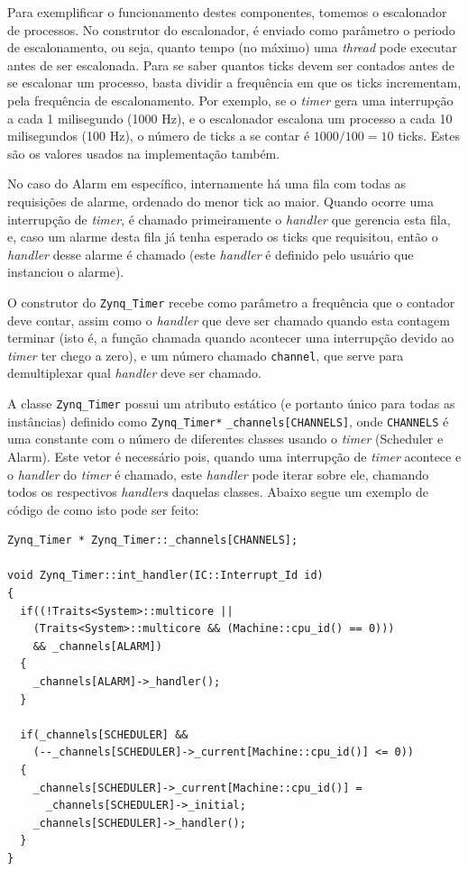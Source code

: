 Para exemplificar o funcionamento destes componentes, tomemos o escalonador de processos. No construtor do escalonador, é enviado como parâmetro o periodo de escalonamento, ou seja, quanto tempo (no máximo) uma \emph{thread} pode executar antes de ser escalonada. Para se saber quantos ticks devem ser contados antes de se escalonar um processo, basta dividir a frequência em que os ticks incrementam, pela frequência de escalonamento. Por exemplo, se o \emph{timer} gera uma interrupção a cada 1 milisegundo (1000 Hz), e o escalonador escalona um processo a cada 10 milisegundos (100 Hz), o número de ticks a se contar é $1000/100 = 10$ ticks. Estes são os valores usados na implementação também.

No caso do Alarm em específico, internamente há uma fila com todas as requisições de alarme, ordenado do menor tick ao maior. Quando ocorre uma interrupção de \emph{timer}, é chamado primeiramente o \emph{handler} que gerencia esta fila, e, caso um alarme desta fila já tenha esperado os ticks que requisitou, então o \emph{handler} desse alarme é chamado (este \emph{handler} é definido pelo usuário que instanciou o alarme).


O construtor do \verb+Zynq_Timer+ recebe como parâmetro a frequência que o contador deve contar, assim como o \emph{handler} que deve ser chamado quando esta contagem terminar (isto é, a função chamada quando acontecer uma interrupção devido ao \emph{timer} ter chego a zero), e um número chamado \verb+channel+, que serve para demultiplexar qual \emph{handler} deve ser chamado.

A classe \verb+Zynq_Timer+ possui um atributo estático (e portanto único para todas as instâncias) definido como \verb+Zynq_Timer*+ \verb+_channels[CHANNELS]+, onde \verb+CHANNELS+ é uma constante com o número de diferentes classes usando o \emph{timer} (Scheduler e Alarm). Este vetor é necessário pois, quando uma interrupção de \emph{timer} acontece e o \emph{handler} do \emph{timer} é chamado, este \emph{handler} pode iterar sobre ele, chamando todos os respectivos \emph{handlers} daquelas classes. Abaixo segue um exemplo de código de como isto pode ser feito:


\label{int_handler}
\begin{lstlisting}
Zynq_Timer * Zynq_Timer::_channels[CHANNELS];

void Zynq_Timer::int_handler(IC::Interrupt_Id id)
{
  if((!Traits<System>::multicore ||
    (Traits<System>::multicore && (Machine::cpu_id() == 0)))
    && _channels[ALARM])
  {
    _channels[ALARM]->_handler();
  }

  if(_channels[SCHEDULER] &&
    (--_channels[SCHEDULER]->_current[Machine::cpu_id()] <= 0))
  {
    _channels[SCHEDULER]->_current[Machine::cpu_id()] =
      _channels[SCHEDULER]->_initial;
    _channels[SCHEDULER]->_handler();
  }
}
\end{lstlisting}

